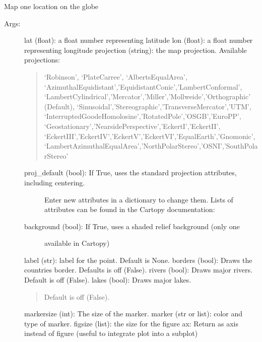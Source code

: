 \documentclass[letterpaper,10pt,english]{sphinxmanual}
\begin{document}
\begin{fulllineitems}
\label{\detokenize{Map:pyleoclim.Map.mapOne}}
Map one location on the globe
\begin{description}
\item[{Args:}] \leavevmode
lat (float): a float number representing latitude
lon (float): a float number representing longitude
projection (string): the map projection. Available projections:
\begin{quote}

‘Robinson’, ‘PlateCarree’, ‘AlbertsEqualArea’,
‘AzimuthalEquidistant’,’EquidistantConic’,’LambertConformal’,
‘LambertCylindrical’,’Mercator’,’Miller’,’Mollweide’,’Orthographic’ (Default),
‘Sinusoidal’,’Stereographic’,’TransverseMercator’,’UTM’,
‘InterruptedGoodeHomolosine’,’RotatedPole’,’OSGB’,’EuroPP’,
‘Geostationary’,’NearsidePerspective’,’EckertI’,’EckertII’,
‘EckertIII’,’EckertIV’,’EckertV’,’EckertVI’,’EqualEarth’,’Gnomonic’,
‘LambertAzimuthalEqualArea’,’NorthPolarStereo’,’OSNI’,’SouthPolarStereo’
\end{quote}
\begin{description}
\item[{proj\_default (bool): If True, uses the standard projection attributes, including centering.}] \leavevmode
Enter new attributes in a dictionary to change them. Lists of attributes
can be found in the Cartopy documentation:
\begin{quote}

\end{quote}

\item[{background (bool): If True, uses a shaded relief background (only one }] \leavevmode
available in Cartopy)

\end{description}

label (str): label for the point. Default is None. 
borders (bool): Draws the countries border. Defaults is off (False). 
rivers (bool): Draws major rivers. Default is off (False).
lakes (bool): Draws major lakes.
\begin{quote}

Default is off (False).
\end{quote}

markersize (int): The size of the marker.
marker (str or list): color and type of marker. 
figsize (list): the size for the figure
ax: Return as axis instead of figure (useful to integrate plot into a subplot)

\end{description}

\end{fulllineitems}
\end{document}
